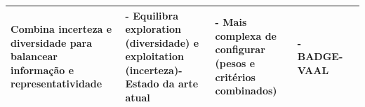 \begin{table}[h!]
{\begin{tabular}{|p{2.5cm}|p{4.5cm}|p{4.5cm}|p{4.5cm}|p{3.5cm}|}
Combina incerteza e diversidade para balancear informação e representatividade & %
- Equilibra exploration (diversidade) e exploitation (incerteza)\newline - Estado da arte atual & %
- Mais complexa de configurar (pesos e critérios combinados) & %
- \ac{BADGE}\newline - \ac{VAAL}\\
\hline
\end{tabular}%
}
\end{table}










